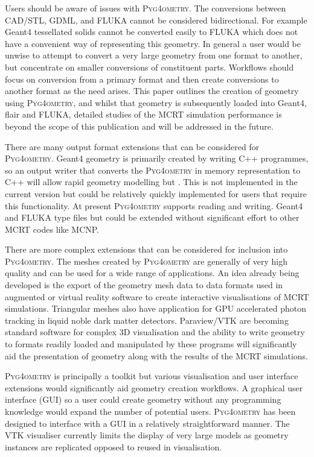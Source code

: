 \documentclass[final,5p,times,twocolumn]{elsarticle}
\newcommand{\PYGEOMETRY}{\textsc{Pyg4ometry}}
\begin{document}
Users should be aware of issues with \PYGEOMETRY{}. The conversions between CAD/STL, GDML, and FLUKA 
cannot be considered bidirectional. For example Geant4 tessellated solids cannot be converted easily to FLUKA which does not 
have a convenient way of representing this geometry. In general a user would be unwise to attempt to convert a very large 
geometry from one format to another, but concentrate on smaller conversions of constituent parts. Workflows should focus 
on conversion from a primary format and then create conversions to another format as the need arises. This paper outlines 
the creation of geometry using \PYGEOMETRY{}, and whilst that geometry is subsequently loaded into Geant4, flair and FLUKA, detailed 
studies of the MCRT simulation performance is beyond the scope of this publication and will be addressed in the future.

There are many output format extensions that can be considered for \PYGEOMETRY{}. 
Geant4 geometry is primarily created by writing C++ programmes, so an output writer that 
converts the \PYGEOMETRY{} in memory representation to C++ will allow rapid geometry 
modelling but . This is not implemented in the current version but could be relatively quickly implemented
for users that require this functionality. At present \PYGEOMETRY{} supports reading and writing. 
Geant4 and FLUKA type files but could be extended without significant effort to other MCRT codes 
like MCNP. 

There are more complex extensions that can be considered for inclusion into \PYGEOMETRY{}.
The meshes created by \PYGEOMETRY{} are generally of very high quality and can be used for a 
wide range of applications. An idea already being developed is the export of the geometry mesh data to
data formats used in augmented or virtual reality software to create interactive visualisations of MCRT 
simulations.  Triangular meshes also have application  for GPU accelerated photon tracking in 
liquid noble dark matter detectors. Paraview/VTK are becoming standard software for complex 3D visualisation and 
the ability to write geometry to formats readily loaded and manipulated by these programs will 
significantly aid the presentation of geometry along with the results of the MCRT simulations.

\PYGEOMETRY{} is principally a toolkit but various visualisation and user interface extensions would 
significantly aid geometry creation workflows. A graphical user interface (GUI) so a user could create 
geometry without any programming knowledge would expand the number of potential users. \PYGEOMETRY{}
has been designed to interface with a GUI in a relatively straightforward manner. The VTK visualiser currently 
limits the display of very large models as geometry instances are replicated opposed to reused in visualisation. 
\end{document}
